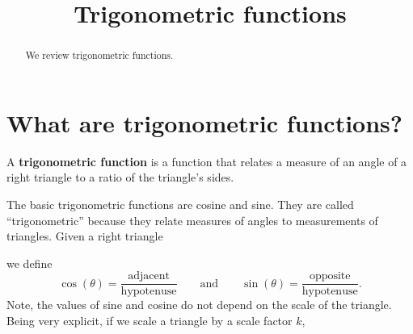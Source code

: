 \documentclass{ximera}
\title[Dig-In:]{Trigonometric functions}
\begin{document}
\begin{abstract}
  We review trigonometric functions.
\end{abstract}
\maketitle



\section{What are trigonometric functions?}

\begin{definition}
  A \textbf{trigonometric function} is a function that relates a measure
  of an angle of a right triangle to a ratio of the triangle's sides.
\end{definition}


The basic trigonometric functions are cosine and sine. They are called
``trigonometric'' because they relate measures of angles to
measurements of triangles. Given a right triangle
\begin{image}[2in]
\end{image}
we define
\[
\cos(\theta) =
\frac{\text{adjacent}}{\text{hypotenuse}}\qquad\text{and}\qquad\sin(\theta)
= \frac{\text{opposite}}{\text{hypotenuse}}.
\]
Note, the values of sine and cosine do not depend on the scale of the
triangle. Being very explicit, if we scale a triangle by a scale
factor $k$,
\end{document}
